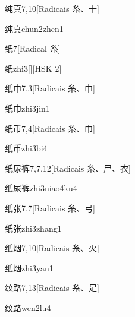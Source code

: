 \begin{entry}{纯真}{7,10}[Radicais ⽷、⼗]
  \begin{phonetics}{纯真}{chun2zhen1}
  \end{phonetics}
\end{entry}

\begin{entry}{纸}{7}[Radical ⽷]
  \begin{phonetics}{纸}{zhi3}[][HSK 2]
  \end{phonetics}
\end{entry}

\begin{entry}{纸巾}{7,3}[Radicais ⽷、⼱]
  \begin{phonetics}{纸巾}{zhi3jin1}
  \end{phonetics}
\end{entry}

\begin{entry}{纸币}{7,4}[Radicais ⽷、⼱]
  \begin{phonetics}{纸币}{zhi3bi4}
  \end{phonetics}
\end{entry}

\begin{entry}{纸尿裤}{7,7,12}[Radicais ⽷、⼫、⾐]
  \begin{phonetics}{纸尿裤}{zhi3niao4ku4}
  \end{phonetics}
\end{entry}

\begin{entry}{纸张}{7,7}[Radicais ⽷、⼸]
  \begin{phonetics}{纸张}{zhi3zhang1}
  \end{phonetics}
\end{entry}

\begin{entry}{纸烟}{7,10}[Radicais ⽷、⽕]
  \begin{phonetics}{纸烟}{zhi3yan1}
  \end{phonetics}
\end{entry}

\begin{entry}{纹路}{7,13}[Radicais ⽷、⾜]
  \begin{phonetics}{纹路}{wen2lu4}
  \end{phonetics}
\end{entry}

